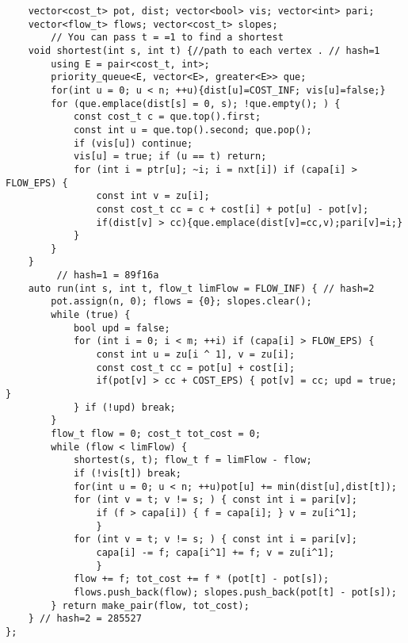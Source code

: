 \documentclass[11pt, a4paper, twoside]{article}
\begin{document}
\begin{verbatim}
    vector<cost_t> pot, dist; vector<bool> vis; vector<int> pari;
    vector<flow_t> flows; vector<cost_t> slopes;
        // You can pass t = =1 to find a shortest
    void shortest(int s, int t) {//path to each vertex . // hash=1
        using E = pair<cost_t, int>;
        priority_queue<E, vector<E>, greater<E>> que;
        for(int u = 0; u < n; ++u){dist[u]=COST_INF; vis[u]=false;}
        for (que.emplace(dist[s] = 0, s); !que.empty(); ) {
            const cost_t c = que.top().first;
            const int u = que.top().second; que.pop();
            if (vis[u]) continue;
            vis[u] = true; if (u == t) return;
            for (int i = ptr[u]; ~i; i = nxt[i]) if (capa[i] > FLOW_EPS) {
                const int v = zu[i];
                const cost_t cc = c + cost[i] + pot[u] - pot[v];
                if(dist[v] > cc){que.emplace(dist[v]=cc,v);pari[v]=i;}
            }
        }
    }
         // hash=1 = 89f16a
    auto run(int s, int t, flow_t limFlow = FLOW_INF) { // hash=2
        pot.assign(n, 0); flows = {0}; slopes.clear();
        while (true) {
            bool upd = false;
            for (int i = 0; i < m; ++i) if (capa[i] > FLOW_EPS) {
                const int u = zu[i ^ 1], v = zu[i];
                const cost_t cc = pot[u] + cost[i];
                if(pot[v] > cc + COST_EPS) { pot[v] = cc; upd = true; }
            } if (!upd) break;
        }
        flow_t flow = 0; cost_t tot_cost = 0;
        while (flow < limFlow) {
            shortest(s, t); flow_t f = limFlow - flow;
            if (!vis[t]) break;
            for(int u = 0; u < n; ++u)pot[u] += min(dist[u],dist[t]);
            for (int v = t; v != s; ) { const int i = pari[v];
                if (f > capa[i]) { f = capa[i]; } v = zu[i^1];
                }
            for (int v = t; v != s; ) { const int i = pari[v];
                capa[i] -= f; capa[i^1] += f; v = zu[i^1];
                }
            flow += f; tot_cost += f * (pot[t] - pot[s]);
            flows.push_back(flow); slopes.push_back(pot[t] - pot[s]);
        } return make_pair(flow, tot_cost);
    } // hash=2 = 285527
};
\end{verbatim}
\end{document}
